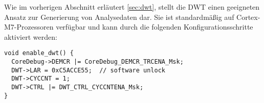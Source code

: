 Wie im vorherigen Abschnitt erläutert \ref{sec:dwt}, stellt die DWT einen
geeigneten Ansatz zur Generierung von Analysedaten dar. Sie ist standardmäßig
auf Cortex-M7-Prozessoren verfügbar und kann durch die folgenden
Konfigurationsschritte aktiviert werden:

\begin{code}
\begin{verbatim}
void enable_dwt() {
  CoreDebug->DEMCR |= CoreDebug_DEMCR_TRCENA_Msk;
  DWT->LAR = 0xC5ACCE55;  // software unlock
  DWT->CYCCNT = 1;
  DWT->CTRL |= DWT_CTRL_CYCCNTENA_Msk;
}
\end{verbatim}
\end{code}

